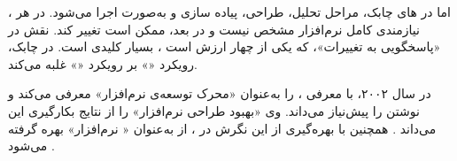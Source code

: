 اما در ‌های چابک، مراحل تحلیل، طراحی، پیاده سازی و
 به‌صورت  اجرا می‌شود. در هر ،
نیازمندی کامل نرم‌افزار مشخص نیست و در  بعد، ممکن است تغییر
کند. نقش  در «پاسخگویی به تغییرات»، که یکی از چهار ارزش
 است ، بسیار کلیدی است. در
 چابک، رویکرد «»
بر رویکرد «» غلبه می‌کند.

 در سال ۲۰۰۲، با معرفی 
،  را به‌عنوان «محرک توسعه‌ی نرم‌افزار» معرفی
می‌کند و نوشتن  را پیش‌نیاز  می‌داند. وی
«بهبود طراحی نرم‌افزار» را از نتایج بکارگیری این  می‌داند
. همچنین با بهره‌گیری از این نگرش در 
، از  به‌عنوان «
نرم‌افزار» بهره گرفته می‌شود .


